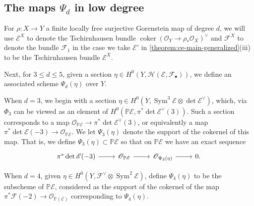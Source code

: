\documentclass[12 pt]{amsart}
\newcommand{\rboxed}[1]{#1}
\theoremstyle{plain}
\theoremstyle{definition}
\newtheorem{definition}[theorem]{Definition}
\theoremstyle{remark}
\numberwithin{equation}{section}
\newcommand\bp{\mathbb P}
\newcommand\sce{\mathscr E}
\newcommand\scf{\mathscr F}
\newcommand\sch{\mathscr H}
\newcommand\scn{\mathscr N}
\newcommand\sco{\mathscr O}
\newcommand \ra{\rightarrow}
\DeclareMathOperator\coker{coker}
\DeclareMathOperator\sym{Sym}
\begin{document}
\subsection{The maps $\Psi_d$ in low degree}
\label{subsection:psid}

For $\rho: X \to Y$ a finite locally free surjective Gorenstein map of degree
$d$, we will use $\mathscr E^X$ to denote the Tschirnhausen bundle $\coker(
\mathscr O_Y \to \rho_* \mathscr O_X)^\vee$ and $\mathscr F^X$ to denote the
bundle $\mathscr F_1$ in the case we take $\mathscr E'$ in 
\autoref{theorem:ce-main-generalized}(iii)
to be the Tschirnhausen bundle $\mathscr E^X$.

Next, for $3 \leq d \leq 5$, given a section $\eta \in H^0(Y,
\sch(\sce,\scf_\bullet))$, we define an associated scheme $\Psi_d(\eta)$
over $Y$.

When $d = 3$,
we begin with a section 
$\eta \in H^0(Y, \sym^3 \sce \otimes \det \sce^{\vee})$, which, via $\Phi_3$ 
can be viewed as 
an element of $H^0(\bp\sce, \pi^* \det \sce^{\vee}(3))$.
Such a section corresponds
to a map $\sco_{\bp\sce} \ra \pi^* \det \sce^{\vee}(3)$, or equivalently a map
$\pi^* \det \sce(-3) \ra \sco_{\bp\sce}$.  
We let $\Psi_3(\eta)$ denote the support of the cokernel of this map.
That is, we define $\Psi_3(\eta) \subset \bp\sce$ so that on $\bp \sce$ we have an exact sequence
\begin{equation}
	\label{equation:section-3-sequence} \begin{tikzcd} \pi^* \det \sce(-3)
		\ar {r} & \sco_{\bp\sce} \ar {r} & \sco_{\Psi_3(\eta)} \ar {r} & 0.
\end{tikzcd}\end{equation} 

When $d =4$,
given $\eta \in H^0(Y, \scf^\vee
\otimes \sym^2 \sce)$, define 
$\Psi_4(\eta)$ to be the subscheme of $\bp\sce$, 
considered as the support of the cokernel of the map 
$\pi^* \scf(-2) \ra \sco_{\bp (\sce)}$
corresponding to $\Psi_4(\eta)$.
\end{document}
